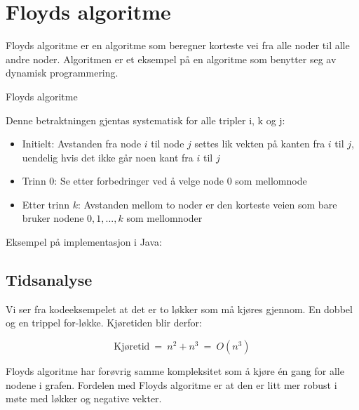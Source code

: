 \section{Floyds algoritme}
\label{floyd}

Floyds algoritme er en algoritme som beregner korteste vei fra alle noder til alle andre noder. Algoritmen er et eksempel på en algoritme som benytter seg av dynamisk programmering. 

\begin{theorem} Floyds algoritme

Denne betraktningen gjentas systematisk for alle tripler i, k og j:
\begin{itemize}
\item Initielt: Avstanden fra node $ i $ til node $ j $ settes lik vekten på kanten fra $ i $ til $ j $, uendelig hvis det ikke går noen kant fra $ i $ til $ j $
\item Trinn 0: Se etter forbedringer ved å velge node 0 som mellomnode
\item Etter trinn $ k $: Avstanden mellom to noder er den korteste veien som bare bruker nodene $ 0, 1, ... , k $ som mellomnoder
\end{itemize}
\end{theorem}

\noindent Eksempel på implementasjon i Java:\newpage
{}

\subsection{Tidsanalyse}
Vi ser fra kodeeksempelet at det er to løkker som må kjøres gjennom. En dobbel og en trippel for-løkke. Kjøretiden blir derfor:

\[ \text{Kjøretid} ~=~ n^2 + n^3  ~=~ O\left(n^3\right) \]

\noindent Floyds algoritme har forøvrig samme kompleksitet som å kjøre  én gang for alle nodene i grafen. Fordelen med Floyds algoritme er at den er litt mer robust i møte med løkker og negative vekter. 


